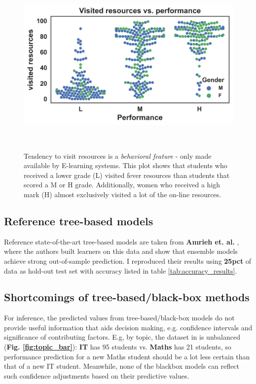 \documentclass{sigchi}
\begin{document}
\begin{figure}
	\centering
	\includegraphics[width=0.95\columnwidth]{figures/vresources_outcome.png}
	\caption{
		Tendency to visit resources is a \textit{behavioral feature} - only made available by E-learning systems. This plot shows that students who received a lower grade (L) visited fever resources than students that scored a M or H grade. Additionally, women who received a high mark (H) almost exclusively visited a lot of the on-line resources.
	}~\label{fig:vresources_outcome}	
\end{figure}


\subsection{Reference tree-based models}
Reference state-of-the-art tree-based models are taken from \textbf{Amrieh
et. al.} \cite{amrieh2016mining}, where the authors built learners on this data and show that ensemble
models achieve strong out-of-sample prediction. I reproduced their results using \textbf{25pct} of data as hold-out test set with accuracy listed in table \ref{tab:accuracy_results}.

\subsection{Shortcomings of tree-based/black-box methods}
For inference, the predicted values from tree-based/black-box models do not provide useful
information that aids decision making, e.g. confidence intervals and
significance of contributing factors. 
\cite{efron2016computer, meier2016predicting} E.g, by topic, the dataset in
\cite{amrieh2016mining} is unbalanced (\textbf{Fig. \ref{fig:topic_bar}}): \textbf{IT} has 95 students
vs. \textbf{Maths} has 21 students, so performance prediction for a new Maths
student should be a lot less certain than that of a new IT
student. Meanwhile, none of the blackbox models can reflect such confidence
adjustments based on their predictive values.
\end{document}

